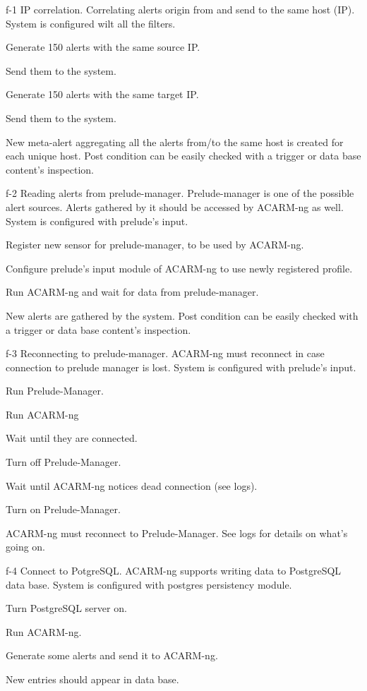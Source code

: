 \testCase
{f-1}
{IP correlation.}
{Correlating alerts origin from and send to the same host (IP).}
{System is configured wilt all the filters.}
{
\begin{enumerate*}
\item Generate 150 alerts with the same source IP.
\item Send them to the system.
\item Generate 150 alerts with the same target IP.
\item Send them to the system.
\end{enumerate*}
}
{New meta-alert aggregating all the alerts from/to the same host is created for each unique host.}
{Post condition can be easily checked with a trigger or data base content's inspection.}


\testCase
{f-2}
{Reading alerts from prelude-manager.}
{Prelude-manager is one of the possible alert sources. Alerts gathered by it should be accessed by ACARM-ng as well.}
{System is configured with prelude's input.}
{
\begin{enumerate*}
\item Register new sensor for prelude-manager, to be used by ACARM-ng.
\item Configure prelude's input module of ACARM-ng to use newly registered profile.
\item Run ACARM-ng and wait for data from prelude-manager.
\end{enumerate*}
}
{New alerts are gathered by the system.}
{Post condition can be easily checked with a trigger or data base content's inspection.}


\testCase
{f-3}
{Reconnecting to prelude-manager.}
{ACARM-ng must reconnect in case connection to prelude manager is lost.}
{System is configured with prelude's input.}
{
\begin{enumerate*}
\item Run Prelude-Manager.
\item Run ACARM-ng
\item Wait until they are connected.
\item Turn off Prelude-Manager.
\item Wait until ACARM-ng notices dead connection (see logs).
\item Turn on Prelude-Manager.
\end{enumerate*}
}
{ACARM-ng must reconnect to Prelude-Manager.}
{See logs for details on what's going on.}


\testCase
{f-4}
{Connect to PotgreSQL.}
{ACARM-ng supports writing data to PostgreSQL data base.}
{System is configured with postgres persistency module.}
{
\begin{enumerate*}
\item Turn PostgreSQL server on.
\item Run ACARM-ng.
\item Generate some alerts and send it to ACARM-ng.
\end{enumerate*}
}
{New entries should appear in data base.}
{}



